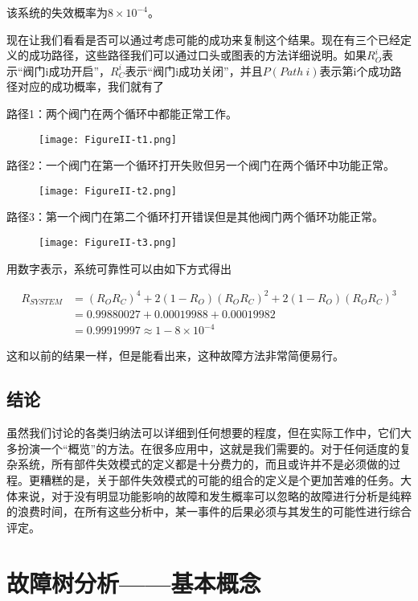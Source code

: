 \documentclass[cn,11pt,chinese]{elegantbook}
\begin{document}
该系统的失效概率为$8 \times 10^{-4}$。

现在让我们看看是否可以通过考虑可能的成功来复制这个结果。现在有三个已经定义的成功路径，这些路径我们可以通过口头或图表的方法详细说明。如果$R^{i}_{O}$表示“阀门i成功开启”，$R^i_C$表示“阀门i成功关闭”，并且$P(Path \ i)$表示第i个成功路径对应的成功概率，我们就有了

路径1：两个阀门在两个循环中都能正常工作。

\begin{figure}[H]
	\centering
	\texttt{[image: FigureII-t1.png]}
\end{figure}

路径2：一个阀门在第一个循环打开失败但另一个阀门在两个循环中功能正常。
\begin{figure}[H]
	\centering
	\texttt{[image: FigureII-t2.png]}
\end{figure}

路径3：第一个阀门在第二个循环打开错误但是其他阀门两个循环功能正常。

\begin{figure}[H]
	\centering
	\texttt{[image: FigureII-t3.png]}
\end{figure}

用数字表示，系统可靠性可以由如下方式得出

\begin{align*}
R_{SYSTEM} &=(R_O R_C)^4+2(1-R_O)(R_O R_C)^2+2(1-R_O)(R_O R_C)^3 \\
&=0.99880027+0.00019988+0.00019982  \\
&=0.99919997
\approx 1-8 \times 10^{-4}
\end{align*}

这和以前的结果一样，但是能看出来，这种故障方法非常简便易行。

\section{结论}

虽然我们讨论的各类归纳法可以详细到任何想要的程度，但在实际工作中，它们大多扮演一个“概览”的方法。在很多应用中，这就是我们需要的。对于任何适度的复杂系统，所有部件失效模式的定义都是十分费力的，而且或许并不是必须做的过程。更糟糕的是，关于部件失效模式的可能的组合的定义是个更加苦难的任务。大体来说，对于没有明显功能影响的故障和发生概率可以忽略的故障进行分析是纯粹的浪费时间，在所有这些分析中，某一事件的后果必须与其发生的可能性进行综合评定。

\chapter{故障树分析——基本概念}
\end{document}
